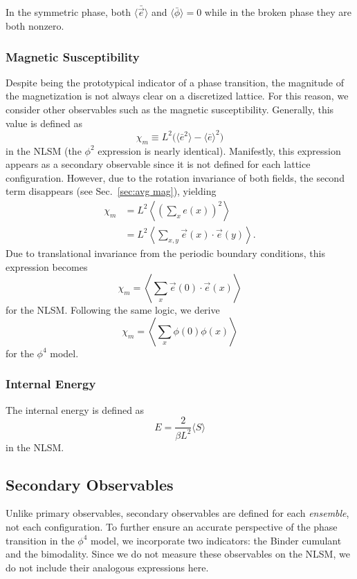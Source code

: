 \documentclass[12pt]{report}
\newcommand{\e}{\vec e}
\begin{document}
In the symmetric phase, both $\langle \bar\e \rangle$ and $\langle \bar\phi \rangle = 0$ while in the broken phase they are both nonzero.

\subsubsection{Magnetic Susceptibility}
Despite being the prototypical indicator of a phase transition, the magnitude of the magnetization is not always clear on a discretized lattice. For this reason, we consider other observables such as the magnetic susceptibility. Generally, this value is defined as 
\begin{equation}
    \chi_m \equiv L^2 \big(\langle {\bar e}^2 \rangle - \langle \bar e \rangle^2\big)
\end{equation}
in the NLSM (the $\phi^2$ expression is nearly identical). Manifestly, this expression appears as a secondary observable since it is not defined for each lattice configuration. However, due to the rotation invariance of both fields, the second term disappears (see Sec.~\ref{sec:avg mag}), yielding
\begin{align}
    \chi_m &= L^2 \left\langle \left( \sum_x e(x) \right)^2\right\rangle  \\
           &= L^2 \left\langle \sum_{x,y}\e(x)\cdot \e(y) \right\rangle. 
\end{align}
Due to translational invariance from the periodic boundary conditions, this expression becomes
\begin{equation}
    \chi_m = \left\langle \sum_x \e(0)\cdot\e(x) \right\rangle
\end{equation}
for the NLSM. Following the same logic, we derive 
\begin{equation}
    \chi_m = \left\langle \sum_x \phi(0)\phi(x) \right\rangle
\end{equation}
for the $\phi^4$ model.

\subsubsection{Internal Energy}
The internal energy is defined as \cite{berg1981}
\begin{equation}
    E = \frac{2}{\beta L^2} \langle S \rangle
\end{equation}
in the NLSM.


\subsection{Secondary Observables}
Unlike primary observables, secondary observables are defined for each \textit{ensemble}, not each configuration. To further ensure an accurate perspective of the phase transition in the $\phi^4$ model, we incorporate two indicators: the Binder cumulant and the bimodality. Since we do not measure these observables on the NLSM, we do not include their analogous expressions here.
\end{document}
